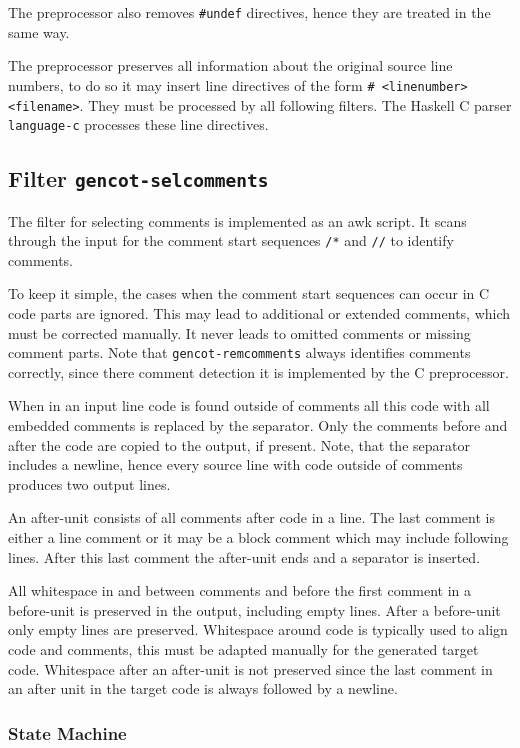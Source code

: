 \documentclass[a4paper]{report}
\newcommand{\code}[1]{\textnormal{\texttt{#1}}}
\begin{document}
The preprocessor also removes \code{\#undef} directives, hence they are treated in the same way.

The preprocessor preserves all information about the original source line numbers, to do so it may insert 
line directives of the form \code{\# <linenumber> <filename>}. They must be processed by all following filters. The Haskell
C parser \code{language-c} processes these line directives.

\subsection{Filter \code{gencot-selcomments}}

The filter for selecting comments is implemented as an awk script. It scans through the input for the comment start
sequences \code{/*} and \code{//} to identify comments. 

To keep it simple, the cases when the comment start sequences can occur in C code parts are ignored. This may lead to
additional or extended comments, which must be corrected manually. It never leads to omitted comments or missing 
comment parts. Note that \code{gencot-remcomments} always identifies comments correctly, since there comment detection
it is implemented by the C preprocessor.

When in an input line code is found outside of comments all this code with all embedded comments is replaced by the
separator. Only the comments before and after the code are copied to the output, if present.
Note, that the separator includes a newline, hence every source line with code outside of
comments produces two output lines. 

An after-unit consists of all comments after code in a line. The last comment is either a line comment or
it may be a block comment which may include following lines. After this last comment the after-unit ends and
a separator is inserted.

All whitespace in and between comments and before the first comment in a before-unit is preserved in the output, 
including empty lines. After a before-unit only empty lines are preserved. Whitespace around code is typically used
to align code and comments, this must be adapted manually for the generated target code. Whitespace after an after-unit
is not preserved since the last comment in an after unit in the target code is always followed by a newline.

\subsubsection{State Machine}
\end{document}
